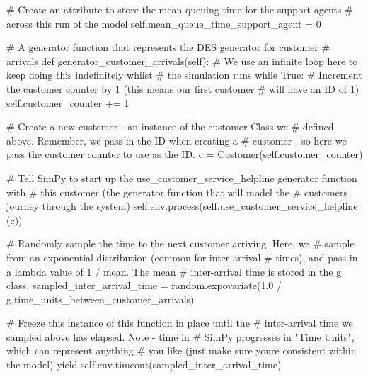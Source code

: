 \documentclass[
  letterpaper,
  DIV=11,
  numbers=noendperiod]{scrreprt}
\newenvironment{Shaded}{}{}
\newcommand{\CommentTok}[1]{\textcolor[rgb]{0.42,0.45,0.49}{#1}}
\newcommand{\ControlFlowTok}[1]{\textcolor[rgb]{0.84,0.23,0.29}{#1}}
\newcommand{\DecValTok}[1]{\textcolor[rgb]{0.00,0.36,0.77}{#1}}
\newcommand{\FloatTok}[1]{\textcolor[rgb]{0.00,0.36,0.77}{#1}}
\newcommand{\KeywordTok}[1]{\textcolor[rgb]{0.84,0.23,0.29}{#1}}
\newcommand{\NormalTok}[1]{\textcolor[rgb]{0.14,0.16,0.18}{#1}}
\newcommand{\OperatorTok}[1]{\textcolor[rgb]{0.14,0.16,0.18}{#1}}
\newcommand{\VariableTok}[1]{\textcolor[rgb]{0.89,0.38,0.04}{#1}}
\begin{document}
\begin{tcolorbox}
\begin{Shaded}
\begin{Highlighting}[]
        \CommentTok{\# Create an attribute to store the mean queuing time for the support agents}
        \CommentTok{\# across this run of the model}
        \VariableTok{self}\NormalTok{.mean\_queue\_time\_support\_agent }\OperatorTok{=} \DecValTok{0}

    \CommentTok{\# A generator function that represents the DES generator for customer}
    \CommentTok{\# arrivals}
    \KeywordTok{def}\NormalTok{ generator\_customer\_arrivals(}\VariableTok{self}\NormalTok{):}
        \CommentTok{\# We use an infinite loop here to keep doing this indefinitely whilst}
        \CommentTok{\# the simulation runs}
        \ControlFlowTok{while} \VariableTok{True}\NormalTok{:}
            \CommentTok{\# Increment the customer counter by 1 (this means our first customer}
            \CommentTok{\# will have an ID of 1)}
            \VariableTok{self}\NormalTok{.customer\_counter }\OperatorTok{+=} \DecValTok{1}

            \CommentTok{\# Create a new customer {-} an instance of the customer Class we}
            \CommentTok{\# defined above.  Remember, we pass in the ID when creating a}
            \CommentTok{\# customer {-} so here we pass the customer counter to use as the ID.}
\NormalTok{            c }\OperatorTok{=}\NormalTok{ Customer(}\VariableTok{self}\NormalTok{.customer\_counter)}

            \CommentTok{\# Tell SimPy to start up the use\_customer\_service\_helpline generator function with}
            \CommentTok{\# this customer (the generator function that will model the}
            \CommentTok{\# customer\textquotesingle{}s journey through the system)}
            \VariableTok{self}\NormalTok{.env.process(}\VariableTok{self}\NormalTok{.use\_customer\_service\_helpline (c))}

            \CommentTok{\# Randomly sample the time to the next customer arriving.  Here, we}
            \CommentTok{\# sample from an exponential distribution (common for inter{-}arrival}
            \CommentTok{\# times), and pass in a lambda value of 1 / mean.  The mean}
            \CommentTok{\# inter{-}arrival time is stored in the g class.}
\NormalTok{            sampled\_inter\_arrival\_time }\OperatorTok{=}\NormalTok{ random.expovariate(}\FloatTok{1.0} \OperatorTok{/}\NormalTok{ g.time\_units\_between\_customer\_arrivals)}

            \CommentTok{\# Freeze this instance of this function in place until the}
            \CommentTok{\# inter{-}arrival time we sampled above has elapsed.  Note {-} time in}
            \CommentTok{\# SimPy progresses in "Time Units", which can represent anything}
            \CommentTok{\# you like (just make sure you\textquotesingle{}re consistent within the model)}
            \ControlFlowTok{yield} \VariableTok{self}\NormalTok{.env.timeout(sampled\_inter\_arrival\_time)}


\end{Highlighting}
\end{Shaded}
\end{tcolorbox}
\end{document}
